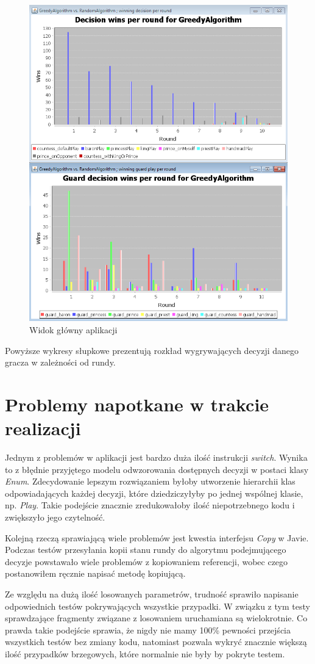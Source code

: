 \begin{figure}[H]
	\centering
	\includegraphics[width=\textwidth]{Resources/decisionWinsPerRoundChart.PNG}
	\caption{Widok główny aplikacji} 
	\label{fig:decisionChart}
\end{figure}

Powyższe wykresy słupkowe prezentują rozkład wygrywających decyzji danego gracza w zależności od rundy.

\section{Problemy napotkane w trakcie realizacji}
Jednym z problemów w aplikacji jest bardzo duża ilość instrukcji \textit{switch}. Wynika to z błędnie przyjętego modelu odwzorowania dostępnych decyzji w postaci klasy \textit{Enum}. Zdecydowanie lepszym rozwiązaniem byłoby utworzenie hierarchii klas odpowiadających każdej decyzji, które dziedziczyłyby po jednej wspólnej klasie, np. \textit{Play}. Takie podejście znacznie zredukowałoby ilość niepotrzebnego kodu i zwiększyło jego czytelność.

Kolejną rzeczą sprawiającą wiele problemów jest kwestia interfejsu \textit{Copy} w Javie. Podczas testów przesyłania kopii stanu rundy do algorytmu podejmującego decyzje powstawało wiele problemów z kopiowaniem referencji, wobec czego postanowiłem ręcznie napisać metodę kopiującą.

Ze względu na dużą ilość losowanych parametrów, trudność sprawiło napisanie odpowiednich testów pokrywających wszystkie przypadki. W związku z tym testy sprawdzające fragmenty związane z losowaniem uruchamiana są wielokrotnie. Co prawda takie podejście sprawia, że nigdy nie mamy 100\% pewności przejścia wszystkich testów bez zmiany kodu, natomiast pozwala wykryć znacznie większą ilość przypadków brzegowych, które normalnie nie były by pokryte testem.